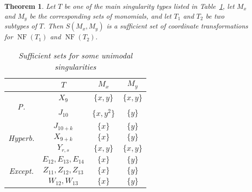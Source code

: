 \documentclass[noend]{amsproc}
\newtheorem{theorem}{Theorem}
\theoremstyle{definition}
\newcommand{\NF}[1]{\operatorname{NF}(#1)}
\begin{document}
\begin{theorem}\label{thm:sufficient_sets}
Let $T$ be one of the main singularity types listed in
Table~\ref{tab:sufficient_sets}, let $M_x$ and $M_y$ be the corresponding sets
of monomials, and let $T_1$ and $T_2$ be two subtypes of $T$. Then
$S(M_x, M_y)$ is a sufficient set of coordinate transformations for $\NF{T_1}$
and $\NF{T_2}$.

\begin{table}[htb]
\centering
\caption{Sufficient sets for some unimodal singularities}
\label{tab:sufficient_sets}
\begin{tabular}{|c|c|c|c|}
\hline

& $T$ & $M_x$ & $M_y$ \\
\hline\hline


\multirow{2}{*}{\begin{sideways}P.\end{sideways}}

& $X_9$    & $\{x, y\}$   & $\{x, y\}$ \\ \cline{2-4}
& $J_{10}$ & $\{x, y^2\}$ & $\{y\}$    \\ \hline


\multirow{3}{*}{\begin{sideways}Hyperb.\end{sideways}}

& $J_{10+k}$ & $\{x\}$    & $\{y\}$    \\ \cline{2-4}
& $X_{9+k}$  & $\{x\}$    & $\{y\}$    \\ \cline{2-4}
& $Y_{r,s}$  & $\{x, y\}$ & $\{x, y\}$ \\ \hline


\multirow{3}{*}{\begin{sideways}Except.\end{sideways}}

& $E_{12}, E_{13}, E_{14}$ & $\{x\}$ & $\{y\}$ \\ \cline{2-4}
& $Z_{11}, Z_{12}, Z_{13}$ & $\{x\}$ & $\{y\}$ \\ \cline{2-4}
& $W_{12}, W_{13}$         & $\{x\}$ & $\{y\}$ \\ \hline

\end{tabular}
\end{table}

\end{theorem}
\end{document}
